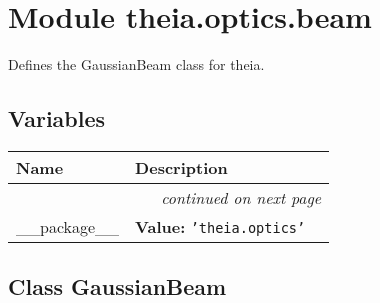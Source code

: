 %
%
%


\section{Module theia.optics.beam}

    \label{theia:optics:beam}
Defines the GaussianBeam class for theia.



  \subsection{Variables}

    \vspace{-1cm}
\hspace{\varindent}\begin{longtable}{|p{\varnamewidth}|p{\vardescrwidth}|l}
\cline{1-2}
\cline{1-2} \centering \textbf{Name} & \centering \textbf{Description}& \\
\cline{1-2}
\endhead\cline{1-2}\multicolumn{3}{r}{\small\textit{continued on next page}}\\\endfoot\cline{1-2}
\endlastfoot\raggedright \_\-\_\-p\-a\-c\-k\-a\-g\-e\-\_\-\_\- & \raggedright \textbf{Value:} 
{\tt \texttt{'}\texttt{theia.optics}\texttt{'}}&\\
\cline{1-2}
\end{longtable}



\subsection{Class GaussianBeam}

